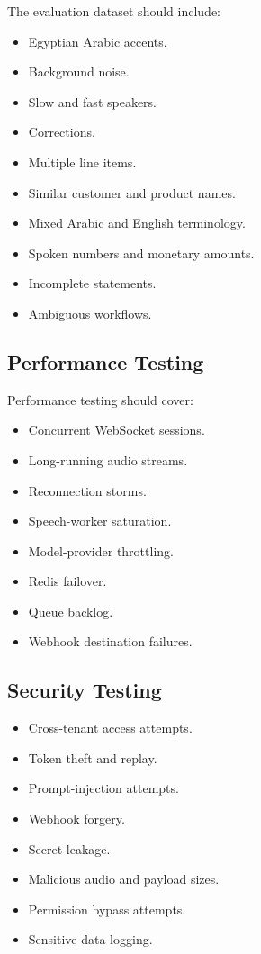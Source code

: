 \documentclass[11pt,a4paper]{article}
\begin{document}
The evaluation dataset should include:

\begin{itemize}
\item Egyptian Arabic accents.
\item Background noise.
\item Slow and fast speakers.
\item Corrections.
\item Multiple line items.
\item Similar customer and product names.
\item Mixed Arabic and English terminology.
\item Spoken numbers and monetary amounts.
\item Incomplete statements.
\item Ambiguous workflows.
\end{itemize}

\subsection{Performance Testing}

Performance testing should cover:

\begin{itemize}
\item Concurrent WebSocket sessions.
\item Long-running audio streams.
\item Reconnection storms.
\item Speech-worker saturation.
\item Model-provider throttling.
\item Redis failover.
\item Queue backlog.
\item Webhook destination failures.
\end{itemize}

\subsection{Security Testing}

\begin{itemize}
\item Cross-tenant access attempts.
\item Token theft and replay.
\item Prompt-injection attempts.
\item Webhook forgery.
\item Secret leakage.
\item Malicious audio and payload sizes.
\item Permission bypass attempts.
\item Sensitive-data logging.
\end{itemize}
\end{document}
